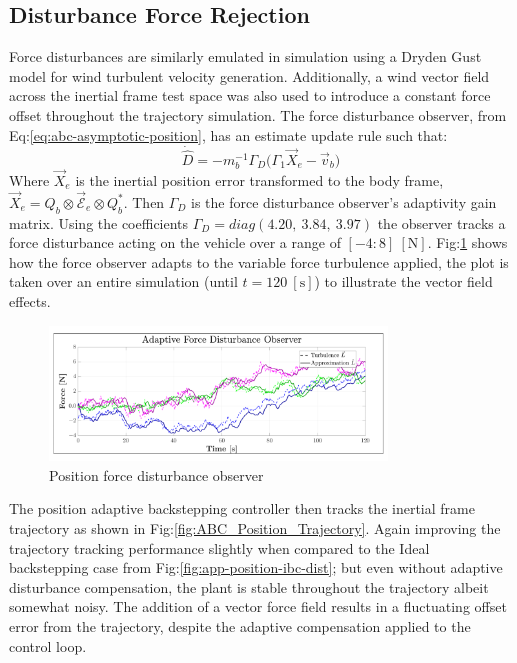 \subsection{Disturbance Force Rejection}
\label{subsec:simulation.disturbance.force}
Force disturbances are similarly emulated in simulation using a Dryden Gust model for wind turbulent velocity generation. Additionally, a wind vector field across the inertial frame test space was also used to introduce a constant force offset throughout the trajectory simulation. The force disturbance observer, from Eq:\ref{eq:abc-asymptotic-position}, has an estimate update rule such that:
\begin{equation}
\dot{\hat{D}}=-m_b^{-1}\Gamma_D\Big(\Gamma_1\vec{X}_e-\vec{v}_b\Big)
\end{equation}
Where $\vec{X}_e$ is the inertial position error transformed to the body frame, $\vec{X}_e=Q_b\otimes\vec{\mathcal{E}}_e\otimes Q_b^*$. Then $\Gamma_D$ is the force disturbance observer's adaptivity gain matrix. Using the coefficients $\Gamma_D=diag(4.20,~3.84,~3.97)$ the observer tracks a force disturbance acting on the vehicle over a range of $[-4:8]~[\text{N}]$. Fig:\ref{fig:force-observer} shows how the force observer adapts to the variable force turbulence applied, the plot is taken over an entire simulation (until $t=120~[\text{s}]$) to illustrate the vector field effects.
\begin{figure}[hbtp]
\vspace{-6pt}
\centering
\includegraphics[width=0.8\textwidth]{graphs/force-observer}
\vspace{-12pt}
\caption{Position force disturbance observer}
\label{fig:force-observer}
\vspace{-16pt}
\end{figure}
\par
The position adaptive backstepping controller then tracks the inertial frame trajectory as shown in Fig:\ref{fig:ABC_Position_Trajectory}. Again improving the trajectory tracking performance slightly when compared to the Ideal backstepping case from Fig:\ref{fig:app-position-ibc-dist}; but even without adaptive disturbance compensation, the plant is stable throughout the trajectory albeit somewhat noisy. The addition of a vector force field results in a fluctuating offset error from the trajectory, despite the adaptive compensation applied to the control loop.
